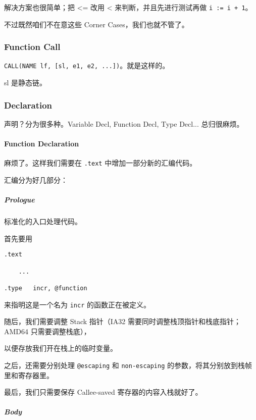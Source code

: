 \documentclass[
]{article}
\begin{document}
解决方案也很简单；把 \textless= 改用 \textless{}
来判断，并且先进行测试再做 \texttt{i\ :=\ i\ +\ 1}。

不过既然咱们不在意这些 Corner Cases，我们也就不管了。

\hypertarget{header-n71}{%
\subsubsection{Function Call}\label{header-n71}}

\texttt{CALL(NAME\ lf,\ {[}sl,\ e1,\ e2,\ ...{]})}。就是这样的。

sl 是静态链。

\hypertarget{header-n74}{%
\subsubsection{Declaration}\label{header-n74}}

声明？分为很多种。Variable Decl, Function Decl, Type Decl...
总归很麻烦。

\hypertarget{header-n76}{%
\paragraph{Function Declaration}\label{header-n76}}

麻烦了。这样我们需要在 \texttt{.text} 中增加一部分新的汇编代码。

汇编分为好几部分：

\hypertarget{header-n79}{%
\subparagraph{Prologue}\label{header-n79}}

标准化的入口处理代码。

首先要用

\begin{verbatim}
.text

	...
	
.type	incr, @function
\end{verbatim}

来指明这是一个名为 \texttt{incr} 的函数正在被定义。

随后，我们需要调整 Stack 指针（IA32
需要同时调整栈顶指针和栈底指针；AMD64 只需要调整栈底），

以便存放我们开在栈上的临时变量。

之后，还需要分别处理 \texttt{@escaping} 和 \texttt{non-escaping}
的参数，将其分别放到栈帧里和寄存器里。

最后，我们只需要保存 Callee-saved 寄存器的内容入栈就好了。

\hypertarget{header-n88}{%
\subparagraph{Body}\label{header-n88}}
\end{document}

